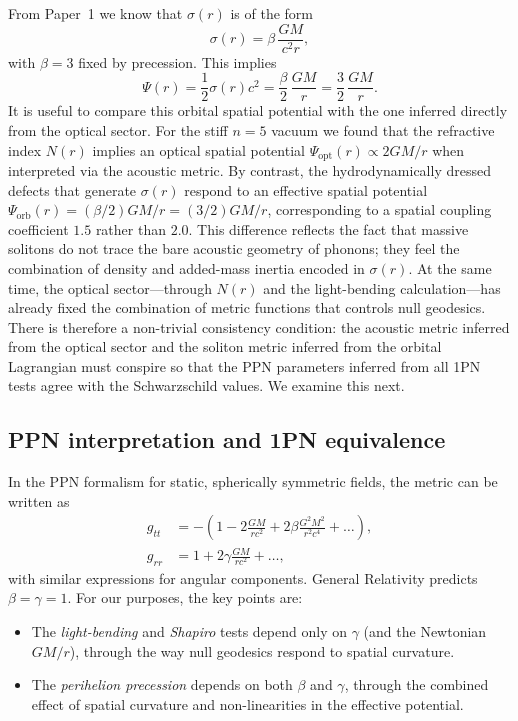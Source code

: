 \documentclass[11pt]{article}
\begin{document}
From Paper~1 we know that $\sigma(r)$ is of the form
\begin{equation}
  \sigma(r)
  = \beta\,\frac{GM}{c^2 r},
\end{equation}
with $\beta = 3$ fixed by precession.
This implies
\begin{equation}
  \Psi(r)
  = \frac{1}{2}\sigma(r) c^2
  = \frac{\beta}{2}\,\frac{GM}{r}
  = \frac{3}{2}\,\frac{GM}{r}.
\end{equation}
It is useful to compare this orbital spatial potential with the one
inferred directly from the optical sector.
For the stiff $n=5$ vacuum we found that the refractive index
$N(r)$ implies an optical spatial potential
$\Psi_{\text{opt}}(r) \propto 2 GM/r$ when interpreted via the acoustic
metric.
By contrast, the hydrodynamically dressed defects that generate
$\sigma(r)$ respond to an effective spatial potential
$\Psi_{\text{orb}}(r) = (\beta/2) GM/r = (3/2) GM/r$, corresponding to
a spatial coupling coefficient $1.5$ rather than $2.0$.
This difference reflects the fact that massive solitons do not trace the
bare acoustic geometry of phonons; they feel the combination of density
and added-mass inertia encoded in $\sigma(r)$.
At the same time, the optical sector---through $N(r)$ and the light-bending
calculation---has already fixed the combination of metric functions that
controls null geodesics.
There is therefore a non-trivial consistency condition: the acoustic metric
inferred from the optical sector and the soliton metric inferred from the
orbital Lagrangian must conspire so that the PPN parameters inferred from
all 1PN tests agree with the Schwarzschild values.
We examine this next.


\subsection{PPN interpretation and 1PN equivalence}
\label{subsec:ppn-equivalence}

In the PPN formalism for static, spherically symmetric fields, the metric
can be written as
\begin{align}
  g_{tt}
  &= -\left(1 - 2\frac{GM}{r c^2}
              + 2\beta \frac{G^2M^2}{r^2 c^4}
              + \dots\right),
  \\
  g_{rr}
  &= 1 + 2\gamma \frac{GM}{r c^2} + \dots,
\end{align}
with similar expressions for angular components.
General Relativity predicts $\beta = \gamma = 1$.
For our purposes, the key points are:

\begin{itemize}
  \item The \emph{light-bending} and \emph{Shapiro} tests depend only on
        $\gamma$ (and the Newtonian $GM/r$), through the way null geodesics
        respond to spatial curvature.
  \item The \emph{perihelion precession} depends on both $\beta$ and
        $\gamma$, through the combined effect of spatial curvature and
        non-linearities in the effective potential.
\end{itemize}
\end{document}
